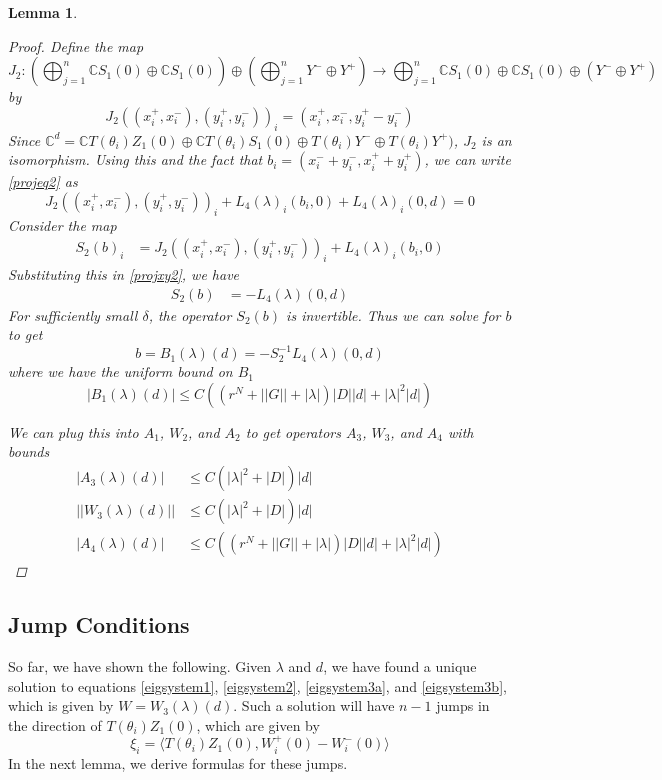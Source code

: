 \documentclass[12pt]{article}
\def\C{{\mathbb C}}
\newtheorem{lemma}{Lemma}
\begin{document}
\begin{lemma}
\begin{proof}
Define the map
\[
J_2: \left( \bigoplus_{j=1}^n \C S_1(0) \oplus \C S_1(0) \right) \oplus
\left( \bigoplus_{j=1}^n Y^- \oplus Y^+ \right) 
\rightarrow \bigoplus_{j=1}^n \C S_1(0) \oplus \C S_1(0) \oplus (Y^- \oplus Y^+)
\]
by 
\[
J_2( (x_i^+, x_i^-),(y_i^+, y_i^-))_i = ( x_i^+, x_i^-, y_i^+ - y_i^- )
\]
Since $\C^d = \C T(\theta_i) Z_1(0) \oplus \C T(\theta_i) S_1(0) \oplus T(\theta_i) Y^- \oplus T(\theta_i) Y^+)$, $J_2$ is an isomorphism. Using this and the fact that $b_i = (x_i^- + y_i^-, x_i^+ + y_i^+)$, we can write \eqref{projeq2} as
\begin{equation}\label{projxy2}
J_2( (x_i^+, x_i^-),(y_i^+, y_i^-))_i 
+ L_4(\lambda)_i(b_i, 0) + L_4(\lambda)_i(0, d) = 0
\end{equation}
Consider the map
\begin{align*}
S_2(b)_i &= J_2( (x_i^+, x_i^-),(y_i^+, y_i^-))_i 
+ L_4(\lambda)_i(b_i, 0) 
\end{align*}
Substituting this in \eqref{projxy2}, we have
\begin{align*}
S_2(b) &= -L_4(\lambda)(0, d)
\end{align*}
For sufficiently small $\delta$, the operator $S_2(b)$ is invertible. Thus we can solve for $b$ to get
\begin{equation}
b = B_1(\lambda)(d) = -S_2^{-1} L_4(\lambda)(0, d)
\end{equation}
where we have the uniform bound on $B_1$
\begin{equation}
|B_1(\lambda)(d)| \leq C \left( (r^{N} + ||G|| + |\lambda|)|D| |d| + |\lambda|^2 |d| \right) 
\end{equation}

We can plug this into $A_1$, $W_2$, and $A_2$ to get operators $A_3$, $W_3$, and $A_4$ with bounds
\begin{align*}
|A_3(\lambda)(d)| &\leq C \left(|\lambda|^2 + |D|\right)|d|\\
||W_3(\lambda)(d)|| &\leq C \left(|\lambda|^2 + |D|\right)|d| \\
|A_4(\lambda)(d)| &\leq 
C\left( (r^N + ||G|| + |\lambda|)|D||d| + |\lambda|^2 |d|  \right)
\end{align*}
\end{proof}
\end{lemma}

\subsection{Jump Conditions}

So far, we have shown the following. Given $\lambda$ and $d$, we have found a unique solution to equations \eqref{eigsystem1}, \eqref{eigsystem2}, \eqref{eigsystem3a}, and \eqref{eigsystem3b}, which is given by $W = W_3(\lambda)(d)$. Such a solution will have $n-1$ jumps in the direction of $T(\theta_i) Z_1(0)$, which are given by
\begin{equation}\label{jumpIP}
\xi_i = \langle T(\theta_i) Z_1(0), W_i^+(0) - W_i^-(0) \rangle
\end{equation}
In the next lemma, we derive formulas for these jumps.
\end{document}
